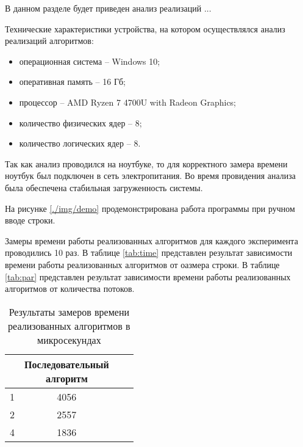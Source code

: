\label{cha:research}
В данном разделе будет приведен анализ реализаций ...

Технические характеристики устройства, на котором осуществлялся анализ реализаций алгоритмов:
\begin{itemize}
	\item операционная система -- Windows 10;
	\item оперативная память -- 16 Гб;
	\item процессор -- AMD Ryzen 7 4700U with Radeon Graphics;
	\item количество физических ядер -- 8;
	\item количество логических ядер -- 8.
\end{itemize}

Так как анализ проводился на ноутбуке, то для корректного замера времени ноутбук был подключен в сеть электропитания. Во время провидения анализа была обеспечена стабильная загруженность системы.

На рисунке \ref{./img/demo} продемонстрирована работа программы при ручном вводе строки.

Замеры времени работы реализованных алгоритмов для каждого эксперимента проводились 10 раз. 
В таблице \ref{tab:time} представлен результат зависимости времени работы реализованных алгоритмов от оазмера строки. В таблице \ref{tab:par} представлен результат зависимости времени работы реализованных алгоритмов от количества потоков.

\renewcommand{\thetable}{\thesubsection.\arabic{table}}
\begin{table}[H]
	\begin{center}
		\begin{center}
			\caption{\label{tab:timeParallel}Результаты замеров времени реализованных алгоритмов в микросекундах}
		\end{center}
		\begin{tabular}{|c|c|c|c|}
			\hline \specialcell{Количество потоков} & \specialcell{Последовательный\\алгоритм}  \\\hline
		 1 & 4056   \\ \hline
		 2 & 2557   \\ \hline
		 4 & 1836   \\ \hline
		\end{tabular}
	\end{center}
\end{table}

